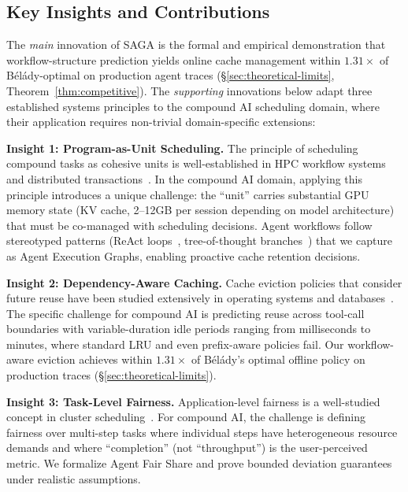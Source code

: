 \documentclass[sigconf]{acmart}
\newcommand{\sysname}{SAGA\xspace}
\begin{document}
\subsection{Key Insights and Contributions}
\label{sec:contributions}

The \emph{main} innovation of \sysname is the formal and empirical demonstration that workflow-structure prediction yields online cache management within $1.31\times$ of B\'{e}l\'{a}dy-optimal on production agent traces (\S\ref{sec:theoretical-limits}, Theorem~\ref{thm:competitive}). The \emph{supporting} innovations below adapt three established systems principles to the compound AI scheduling domain, where their application requires non-trivial domain-specific extensions:

\textbf{Insight 1: Program-as-Unit Scheduling.} The principle of scheduling compound tasks as cohesive units is well-established in HPC workflow systems~\cite{thain2005condor,deelman2015pegasus,rocklin2015dask} and distributed transactions~\cite{corbett2013spanner}. In the compound AI domain, applying this principle introduces a unique challenge: the ``unit'' carries substantial GPU memory state (KV cache, 2--12GB per session depending on model architecture) that must be co-managed with scheduling decisions. Agent workflows follow stereotyped patterns (ReAct loops~\cite{yao2023react}, tree-of-thought branches~\cite{yao2024tree}) that we capture as Agent Execution Graphs, enabling proactive cache retention decisions.

\textbf{Insight 2: Dependency-Aware Caching.} Cache eviction policies that consider future reuse have been studied extensively in operating systems and databases~\cite{belady1966replacement,megiddo2003arc,patterson1995prefetching}. The specific challenge for compound AI is predicting reuse across tool-call boundaries with variable-duration idle periods ranging from milliseconds to minutes, where standard LRU and even prefix-aware policies fail. Our workflow-aware eviction achieves within $1.31\times$ of B\'{e}l\'{a}dy's optimal offline policy on production traces (\S\ref{sec:theoretical-limits}).

\textbf{Insight 3: Task-Level Fairness.} Application-level fairness is a well-studied concept in cluster scheduling~\cite{mahajan2020themis,ghodsi2011drf}. For compound AI, the challenge is defining fairness over multi-step tasks where individual steps have heterogeneous resource demands and where ``completion'' (not ``throughput'') is the user-perceived metric. We formalize Agent Fair Share and prove bounded deviation guarantees under realistic assumptions.
\end{document}
